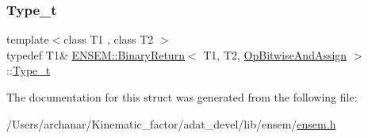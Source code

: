 \mbox{\label{structENSEM_1_1BinaryReturn_3_01T1_00_01T2_00_01OpBitwiseAndAssign_01_4_a89c578dd7fb24880911d984649901627}} 
\subsubsection{\texorpdfstring{Type\_t}{Type\_t}\hspace{0.1cm}{\footnotesize\ttfamily [2/2]}}
{\footnotesize\ttfamily template$<$class T1 , class T2 $>$ \\
typedef T1\& \mbox{\hyperlink{structENSEM_1_1BinaryReturn}{E\+N\+S\+E\+M\+::\+Binary\+Return}}$<$ T1, T2, \mbox{\hyperlink{structENSEM_1_1OpBitwiseAndAssign}{Op\+Bitwise\+And\+Assign}} $>$\+::\mbox{\hyperlink{structENSEM_1_1BinaryReturn_3_01T1_00_01T2_00_01OpBitwiseAndAssign_01_4_a89c578dd7fb24880911d984649901627}{Type\+\_\+t}}}



The documentation for this struct was generated from the following file\+:\begin{DoxyCompactItemize}
\item 
/\+Users/archanar/\+Kinematic\+\_\+factor/adat\+\_\+devel/lib/ensem/\mbox{\hyperlink{lib_2ensem_2ensem_8h}{ensem.\+h}}\end{DoxyCompactItemize}

